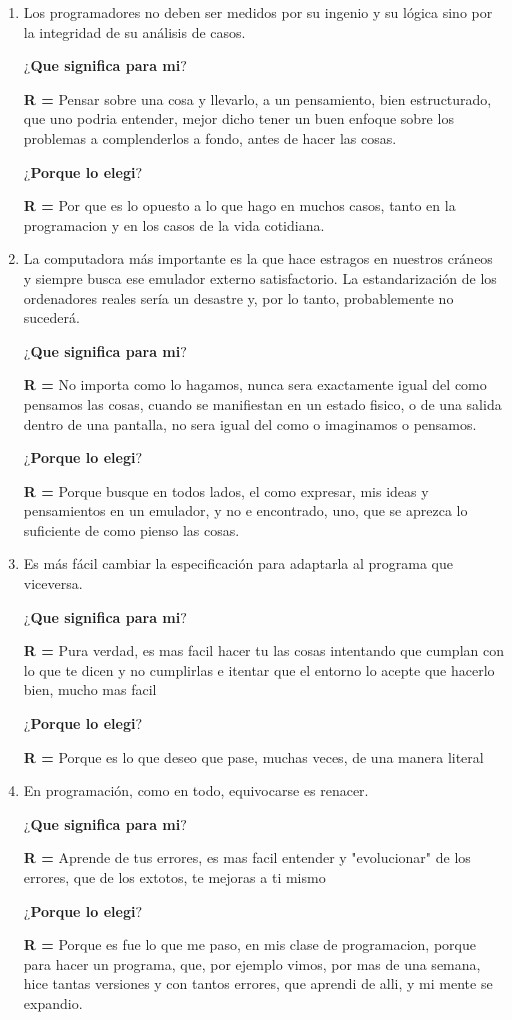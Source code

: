 \documentclass[letterpaper,12pt]{article}
\begin{document}
\begin{enumerate}
\item Los programadores no deben ser medidos por su ingenio y su lógica sino por la integridad de su análisis de casos.\par
\textbf{$¿$Que significa para mi$?$}\par
\textbf{R =} \text Pensar sobre una cosa y llevarlo, a un pensamiento, bien estructurado, que uno podria entender, mejor dicho tener un buen enfoque sobre los problemas a complenderlos a fondo, antes de hacer las cosas.\par
\textbf{$¿$Porque lo elegi$?$}\par
\textbf{R =} \text Por que es lo opuesto a lo que hago en muchos casos, tanto en la programacion y en los casos de la vida cotidiana.

\item La computadora más importante es la que hace estragos en nuestros cráneos y siempre busca ese emulador externo satisfactorio. La estandarización de los ordenadores reales sería un desastre y, por lo tanto, probablemente no sucederá.\par
\textbf{$¿$Que significa para mi$?$}\par
\textbf{R =} \text No importa como lo hagamos, nunca sera exactamente igual del como pensamos las cosas, cuando se manifiestan en un estado 
fisico, o de una salida dentro de una pantalla, no sera igual del como o imaginamos o pensamos.\par
\textbf{$¿$Porque lo elegi$?$}\par
\textbf{R =} \text Porque busque en todos lados, el como expresar, mis ideas y pensamientos en un emulador, y no e encontrado, uno, que se aprezca
lo suficiente de como pienso las cosas.

\item Es más fácil cambiar la especificación para adaptarla al programa que viceversa.\par
\textbf{$¿$Que significa para mi$?$}\par
\textbf{R =} \text Pura verdad, es mas facil hacer tu las cosas intentando que cumplan con lo que te dicen y no cumplirlas e itentar que el entorno lo acepte que hacerlo bien, mucho mas facil\par
\textbf{$¿$Porque lo elegi$?$}\par
\textbf{R =} \text Porque es lo que deseo que pase, muchas veces, de una manera literal

\newpage
\item En programación, como en todo, equivocarse es renacer.\par
\textbf{$¿$Que significa para mi$?$}\par
\textbf{R =} \text Aprende de tus errores, es mas facil entender y "evolucionar" de los errores, que de los extotos, te mejoras a ti mismo\par
\textbf{$¿$Porque lo elegi$?$}\par
\textbf{R =} \text Porque es fue lo que me paso, en mis clase de programacion, porque para hacer un programa, que, por ejemplo vimos, por mas de una semana, hice tantas versiones y con tantos errores, que aprendi de alli, y mi mente se expandio.


\end{enumerate}
\end{document}

